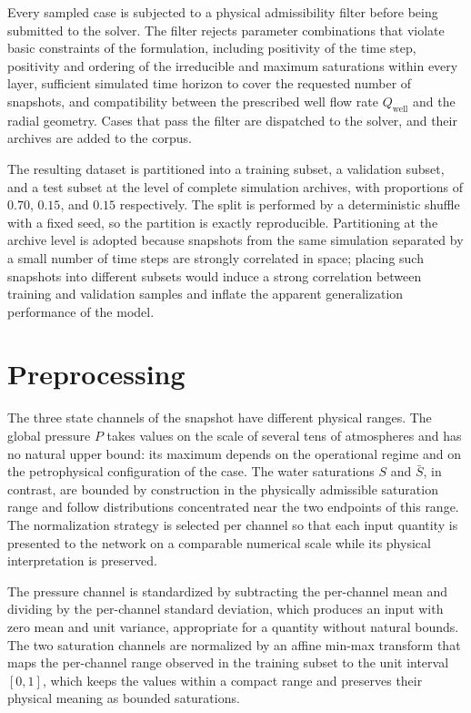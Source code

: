 Every sampled case is subjected to a physical admissibility filter before being submitted to the solver. The filter rejects parameter combinations that violate basic constraints of the formulation, including positivity of the time step, positivity and ordering of the irreducible and maximum saturations within every layer, sufficient simulated time horizon to cover the requested number of snapshots, and compatibility between the prescribed well flow rate $Q_{\text{well}}$ and the radial geometry. Cases that pass the filter are dispatched to the solver, and their archives are added to the corpus.

The resulting dataset is partitioned into a training subset, a validation subset, and a test subset at the level of complete simulation archives, with proportions of $0.70$, $0.15$, and $0.15$ respectively. The split is performed by a deterministic shuffle with a fixed seed, so the partition is exactly reproducible. Partitioning at the archive level is adopted because snapshots from the same simulation separated by a small number of time steps are strongly correlated in space; placing such snapshots into different subsets would induce a strong correlation between training and validation samples and inflate the apparent generalization performance of the model.


\section{Preprocessing}
\label{sec:method_preprocessing}


The three state channels of the snapshot have different physical ranges. The global pressure $P$ takes values on the scale of several tens of atmospheres and has no natural upper bound: its maximum depends on the operational regime and on the petrophysical configuration of the case. The water saturations $S$ and $\bar{S}$, in contrast, are bounded by construction in the physically admissible saturation range and follow distributions concentrated near the two endpoints of this range. The normalization strategy is selected per channel so that each input quantity is presented to the network on a comparable numerical scale while its physical interpretation is preserved.

The pressure channel is standardized by subtracting the per-channel mean and dividing by the per-channel standard deviation, which produces an input with zero mean and unit variance, appropriate for a quantity without natural bounds. The two saturation channels are normalized by an affine min-max transform that maps the per-channel range observed in the training subset to the unit interval $[0, 1]$, which keeps the values within a compact range and preserves their physical meaning as bounded saturations.

